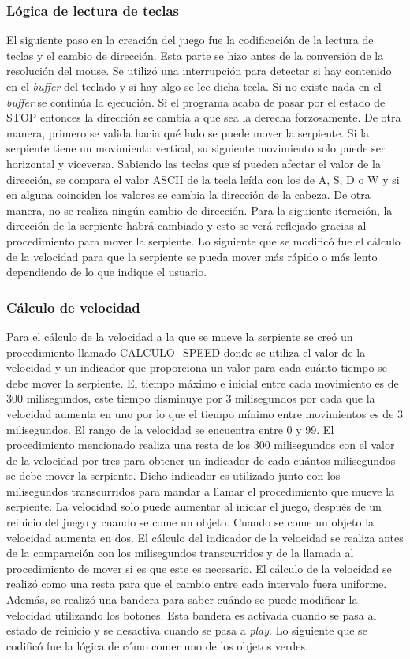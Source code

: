 \documentclass[12pt]{article}
\begin{document}
\subsubsection*{Lógica de lectura de teclas}
El siguiente paso en la creación del juego fue la codificación de la lectura de teclas y el cambio de dirección. Esta parte se hizo antes de la conversión de la resolución del mouse. Se utilizó una interrupción para detectar si hay contenido en el \textit{buffer} del teclado y si hay algo se lee dicha tecla. Si no existe nada en el \textit{buffer} se continúa la ejecución. Si el programa acaba de pasar por el estado de STOP entonces la dirección se cambia a que sea la derecha forzosamente. De otra manera, primero se valida hacia qué lado se puede mover la serpiente. Si la serpiente tiene un movimiento vertical, su siguiente movimiento solo puede ser horizontal y viceversa. Sabiendo las teclas que sí pueden afectar el valor de la dirección, se compara el valor ASCII de la tecla leída con los de A, S, D o W y si en alguna coinciden los valores se cambia la dirección de la cabeza. De otra manera, no se realiza ningún cambio de dirección. Para la siguiente iteración, la dirección de la serpiente habrá cambiado y esto se verá reflejado gracias al procedimiento para mover la serpiente. Lo siguiente que se modificó fue el cálculo de la velocidad para que la serpiente se pueda mover más rápido o más lento dependiendo de lo que indique el usuario.

\subsubsection*{Cálculo de velocidad}
Para el cálculo de la velocidad a la que se mueve la serpiente se creó un procedimiento llamado CALCULO\_SPEED donde se utiliza el valor de la velocidad y un indicador que proporciona un valor para cada cuánto tiempo se debe mover la serpiente. El tiempo máximo e inicial entre cada movimiento es de 300 milisegundos, este tiempo disminuye por 3 milisegundos por cada que la velocidad aumenta en uno por lo que el tiempo mínimo entre movimientos es de 3 milisegundos. El rango de la velocidad se encuentra entre 0 y 99. El procedimiento mencionado realiza una resta de los 300 milisegundos con el valor de la velocidad por tres para obtener un indicador de cada cuántos milisegundos se debe mover la serpiente. Dicho indicador es utilizado junto con los milisegundos transcurridos para mandar a llamar el procedimiento que mueve la serpiente. La velocidad solo puede aumentar al iniciar el juego, después de un reinicio del juego y cuando se come un objeto. Cuando se come un objeto la velocidad aumenta en dos. El cálculo del indicador de la velocidad se realiza antes de la comparación con los milisegundos transcurridos y de la llamada al procedimiento de mover si es que este es necesario. El cálculo de la velocidad se realizó como una resta para que el cambio entre cada intervalo fuera uniforme. Además, se realizó una bandera para saber cuándo se puede modificar la velocidad utilizando los botones. Esta bandera es activada cuando se pasa al estado de reinicio y se desactiva cuando se pasa a \textit{play}. Lo siguiente que se codificó fue la lógica de cómo comer uno de los objetos verdes.
\end{document}
